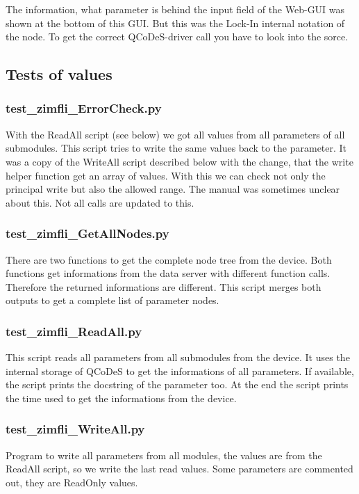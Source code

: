\documentclass[11pt]{article} %
\begin{document}
The information, what parameter is behind the input field of the Web-GUI was shown at the bottom of this GUI. But this was the Lock-In internal notation of the node. To get the correct QCoDeS-driver call you have to look into the sorce.


\subsection{Tests of values}

\subsubsection{test\_zimfli\_ErrorCheck.py}
With the ReadAll script (see below) we got all values from all parameters of all submodules. This script tries to write the same values back to the parameter. It was a copy of the WriteAll script described below with the change, that the write helper function get an array of values. With this we can check not only the principal write but also the allowed range. The manual was sometimes unclear about this. Not all calls are updated to this.

\subsubsection{test\_zimfli\_GetAllNodes.py}
There are two functions to get the complete node tree from the device. Both functions get informations from the data server with different function calls. Therefore the returned informations are different. This script merges both outputs to get a complete list of parameter nodes.

\subsubsection{test\_zimfli\_ReadAll.py}
This script reads all parameters from all submodules from the device. It uses the internal storage of QCoDeS to get the informations of all parameters. If available, the script prints the docstring of the parameter too. At the end the script prints the time used to get the informations from the device.

\subsubsection{test\_zimfli\_WriteAll.py}
Program to write all parameters from all modules, the values are from the ReadAll script, so we write the last read values. Some parameters are commented out, they are ReadOnly values.
\end{document}
